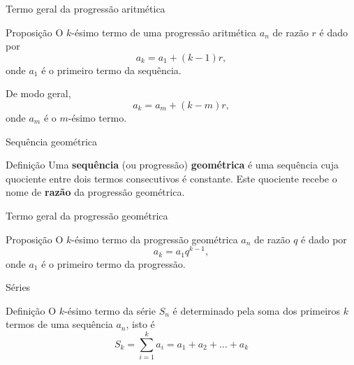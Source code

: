 \begin{frame}[fragile]{Termo geral da progressão aritmética}

    \begin{block}{Proposição}
        O $k$-ésimo termo de uma progressão aritmética $a_n$ de razão $r$ é dado por
        $$
            a_k = a_1 + (k - 1)r,
        $$
        onde $a_1$ é o primeiro termo da sequência.

        De modo geral,
        $$
            a_k = a_m + (k - m)r,
        $$
        onde $a_m$ é o $m$-ésimo termo.
    \end{block}

\end{frame}

\begin{frame}[fragile]{Sequência geométrica}

    \begin{block}{Definição}
        Uma \textbf{sequência} (ou progressão) \textbf{geométrica} é uma sequência cuja quociente entre dois termos consecutivos é constante. Este quociente recebe o nome de \textbf{razão} da progressão geométrica.
    \end{block}

\end{frame}

\begin{frame}[fragile]{Termo geral da progressão geométrica}

    \begin{block}{Proposição}
        O $k$-ésimo termo da progressão geométrica $a_n$ de razão $q$ é dado por
        $$
            a_k = a_1q^{k - 1},
        $$
        onde $a_1$ é o primeiro termo da progressão.
    \end{block}

\end{frame}

\begin{frame}[fragile]{Séries}

    \begin{block}{Definição}
        O $k$-ésimo termo da série $S_n$ é determinado pela soma dos primeiros $k$ termos de uma sequência $a_n$, isto é
        $$
            S_k = \sum_{i = 1}^k a_i = a_1 + a_2 + \ldots + a_k
        $$
    \end{block}

\end{frame}

